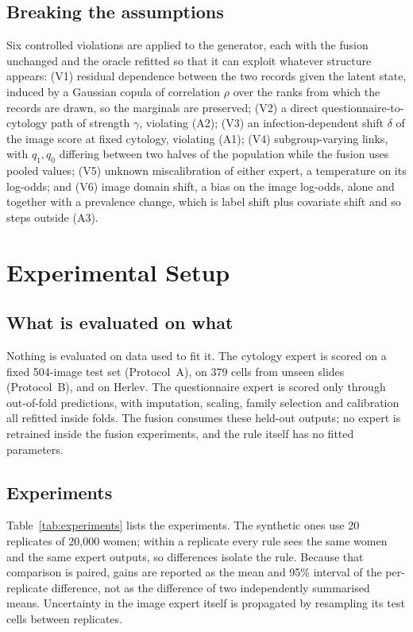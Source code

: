 \documentclass[lettersize,journal]{IEEEtran}
\begin{document}
\subsection{Breaking the assumptions}
\label{sec:violations}
Six controlled violations are applied to the generator, each with the fusion unchanged and the oracle refitted so that it can exploit whatever structure appears: (V1) residual dependence between the two records given the latent state, induced by a Gaussian copula of correlation $\rho$ over the ranks from which the records are drawn, so the marginals are preserved; (V2) a direct questionnaire-to-cytology path of strength $\gamma$, violating (A2); (V3) an infection-dependent shift $\delta$ of the image score at fixed cytology, violating (A1); (V4) subgroup-varying links, with $q_1,q_0$ differing between two halves of the population while the fusion uses pooled values; (V5) unknown miscalibration of either expert, a temperature on its log-odds; and (V6) image domain shift, a bias on the image log-odds, alone and together with a prevalence change, which is label shift plus covariate shift and so steps outside (A3).

\section{Experimental Setup}
\label{sec:setup}

\subsection{What is evaluated on what}
Nothing is evaluated on data used to fit it. The cytology expert is scored on a fixed 504-image test set (Protocol~A), on 379 cells from unseen slides (Protocol~B), and on Herlev. The questionnaire expert is scored only through out-of-fold predictions, with imputation, scaling, family selection and calibration all refitted inside folds. The fusion consumes these held-out outputs; no expert is retrained inside the fusion experiments, and the rule itself has no fitted parameters.

\subsection{Experiments}
Table~\ref{tab:experiments} lists the experiments. The synthetic ones use 20 replicates of 20,000 women; within a replicate every rule sees the same women and the same expert outputs, so differences isolate the rule. Because that comparison is paired, gains are reported as the mean and 95\% interval of the per-replicate difference, not as the difference of two independently summarised means. Uncertainty in the image expert itself is propagated by resampling its test cells between replicates.
\end{document}
